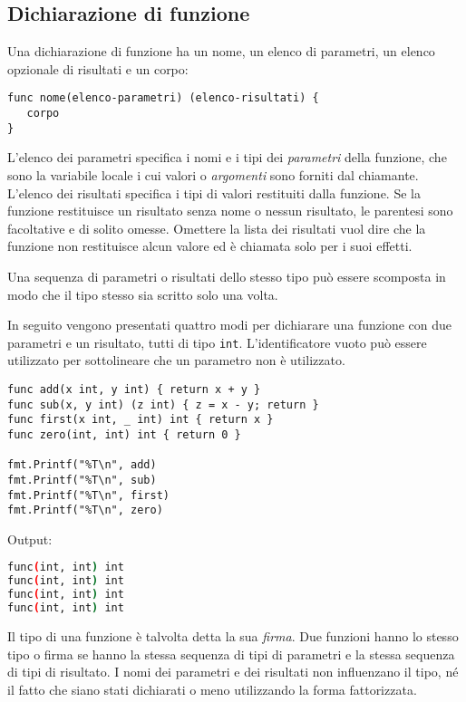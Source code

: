 \documentclass[../../thesis.tex]{subfiles}
\begin{document}
    \subsection{Dichiarazione di funzione}\label{subsec:dichiarazione-di-funzione}
    Una dichiarazione di funzione ha un nome, un elenco di parametri, un elenco opzionale di risultati e un corpo:
    \begin{lstlisting}[label = {lst:lstlisting4-1.1}]
func nome(elenco-parametri) (elenco-risultati) {
   corpo
}
    \end{lstlisting}
    L'elenco dei parametri specifica i nomi e i tipi dei \textit{parametri} della funzione, che sono la variabile locale i cui valori o \textit{argomenti} sono forniti dal chiamante.
    L'elenco dei risultati specifica i tipi di valori restituiti dalla funzione.
    Se la funzione restituisce un risultato senza nome o nessun risultato, le parentesi sono facoltative e di solito omesse.
    Omettere la lista dei risultati vuol dire che la funzione non restituisce alcun valore ed è chiamata solo per i suoi effetti.
    \hfill \vspace{12pt}

    Una sequenza di parametri o risultati dello stesso tipo può essere scomposta in modo che il tipo stesso sia scritto solo una volta.
    \hfill \vspace{12pt}

    In seguito vengono presentati quattro modi per dichiarare una funzione con due parametri e un risultato, tutti di tipo \verb"int".
    L'identificatore vuoto può essere utilizzato per sottolineare che un parametro non è utilizzato.
    \begin{lstlisting}[frame = single, label = {lst:lstlisting4-1.2}]
func add(x int, y int) { return x + y }
func sub(x, y int) (z int) { z = x - y; return }
func first(x int, _ int) int { return x }
func zero(int, int) int { return 0 }

fmt.Printf("%T\n", add)
fmt.Printf("%T\n", sub)
fmt.Printf("%T\n", first)
fmt.Printf("%T\n", zero)
    \end{lstlisting}
    Output:
    \begin{lstlisting}[language = bash, frame = L, label = {lst:lstlisting4-1.3}]
func(int, int) int
func(int, int) int
func(int, int) int
func(int, int) int
    \end{lstlisting}
    Il tipo di una funzione è talvolta detta la sua \textit{firma}.
    Due funzioni hanno lo stesso tipo o firma se hanno la stessa sequenza di tipi di parametri e la stessa sequenza di tipi di risultato.
    I nomi dei parametri e dei risultati non influenzano il tipo, né il fatto che siano stati dichiarati o meno utilizzando la forma fattorizzata.
    \hfill \vspace{12pt}
\end{document}
